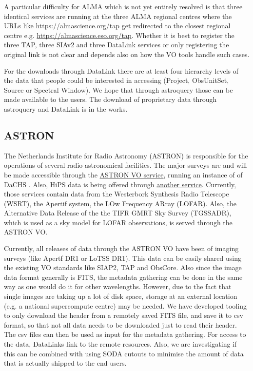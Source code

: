 \documentclass[11pt,a4paper]{ivoatex/ivoa}
\begin{document}
{A particular difficulty for ALMA which is not yet entirely resolved is that three identical services are 
running at the three ALMA regional centres where the URLs like \url{https://almascience.org/tap} get 
redirected
to the closest regional centre e.g. \url{https://almascience.eso.org/tap}.
Whether it is best to register the three TAP, three SIAv2 and three DataLink services or only 
registering the original link is not clear and depends also on how the VO tools handle such cases.

For the downloads through DataLink there are at least four hierarchy
levels of the data that people could be interested in accessing (Project, ObsUnitSet, Source or Spectral
Window). We hope that through astroquery those can be made available to the users. The download of
proprietary data through astroquery and DataLink is in the works.

\subsection{ASTRON}\label{sec:Astron}
The Netherlands Institute for Radio Astronomy (ASTRON) is responsible for the operations of several radio astronomical facilities. The major surveys are and will be made accessible through the   {\href{https://vo.astron.nl/}{ASTRON VO service}}, running an instance of of DaCHS \citep{10.1016/j.ascom.2014.08.003}. Also, HiPS data is being offered through \href{https://hips.astron.nl/}{another service}. Currently, those services contain data from the Westerbork Synthesis Radio Telescope (WSRT), the Apertif system, the LOw Frequency ARray (LOFAR). Also, the Alternative Data Release of the the TIFR GMRT Sky Survey (TGSSADR), which is used as a sky model for LOFAR observations, is served through the ASTRON VO.

Currently, all releases of data through the ASTRON VO have been of imaging surveys (like Apertf DR1 or LoTSS DR1). This data can be easily shared using the existing VO standards like SIAP2, TAP and ObsCore. Also since the image data format generally is FITS, the metadata gathering can be done in the same way as one would do it for other wavelengths. However, due to the fact that single images are taking up a lot of disk space, storage at an external location (e.g. a national supercompute centre) may be needed. We have developed tooling to only download the header from a remotely saved FITS file, and save it to csv format, so that not all data needs to be downloaded just to read their header. The csv files can then be used as input for the metadata gathering. For access to the data, DataLinks link to the remote resources. Also, we are investigating if this can be combined with using SODA cutouts to minimise the amount of data that is actually shipped to the end users.  

}
\end{document}
